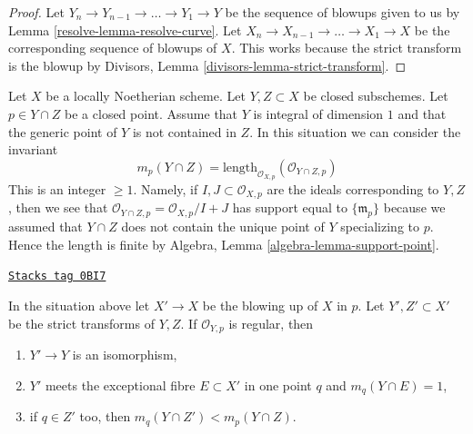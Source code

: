 \begin{proof}

Let $Y_n \to Y_{n - 1} \to \ldots \to Y_1 \to Y$ be the sequence of
blowups given to us by Lemma \ref{resolve-lemma-resolve-curve}. Let
$X_n \to X_{n - 1} \to \ldots \to X_1 \to X$ be the corresponding
sequence of blowups of $X$. This works because the strict transform
is the blowup by Divisors, Lemma \ref{divisors-lemma-strict-transform}.
\end{proof}

Let $X$ be a locally Noetherian scheme. Let $Y, Z \subset X$ be
closed subschemes. Let $p \in Y \cap Z$ be a closed point. Assume
that $Y$ is integral of dimension $1$ and that the generic point of $Y$
is not contained in $Z$. In this situation we can
consider the invariant
\begin{equation}
\label{equation-multiplicity}
m_p(Y \cap Z) =
\text{length}_{\mathcal{O}_{X, p}}(\mathcal{O}_{Y \cap Z, p})
\end{equation}
This is an integer $\geq 1$. Namely, if $I, J \subset \mathcal{O}_{X, p}$
are the ideals corresponding to $Y, Z$, then we see that
$\mathcal{O}_{Y \cap Z, p} = \mathcal{O}_{X, p}/I + J$
has support equal to $\{\mathfrak m_p\}$ because we assumed that
$Y \cap Z$ does not contain the unique point of $Y$ specializing to $p$.
Hence the length is finite by
Algebra, Lemma \ref{algebra-lemma-support-point}.

\begin{lemma}
\label{resolve-lemma-blowup-nonsingular-curves-meeting-at-point}
\href{https://stacks.math.columbia.edu/tag/0BI7}{\texttt{Stacks tag 0BI7}}

In the situation above let $X' \to X$ be the blowing up of $X$ in $p$.
Let $Y', Z' \subset X'$ be the strict transforms of $Y, Z$.
If $\mathcal{O}_{Y, p}$ is regular, then
\begin{enumerate}
\item $Y' \to Y$ is an isomorphism,
\item $Y'$ meets the exceptional fibre $E \subset X'$ in one point
$q$ and $m_q(Y \cap E) = 1$,
\item if $q \in Z'$ too, then $m_q(Y \cap Z') < m_p(Y \cap Z)$.
\end{enumerate}
\end{lemma}

